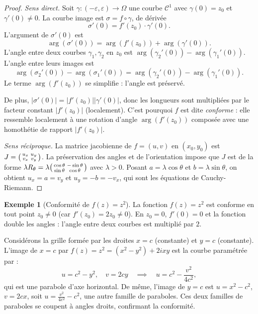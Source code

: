 \documentclass[12pt,a4paper,openany]{book}
\theoremstyle{definition}
\newtheorem{exemple}[definition]{Exemple}
\theoremstyle{plain}
\theoremstyle{remark}
\newcommand{\abs}[1]{\left|#1\right|}
\begin{document}
\begin{proof}
\emph{Sens direct.} Soit $\gamma : (-\varepsilon, \varepsilon) \to \Omega$ une courbe $\mathscr{C}^1$ avec $\gamma(0) = z_0$ et $\gamma'(0) \neq 0$. La courbe image est $\sigma = f \circ \gamma$, de dérivée
\[
  \sigma'(0) = f'(z_0) \cdot \gamma'(0).
\]
L'argument de $\sigma'(0)$ est
\[
  \arg(\sigma'(0)) = \arg(f'(z_0)) + \arg(\gamma'(0)).
\]
L'angle entre deux courbes $\gamma_1, \gamma_2$ en $z_0$ est $\arg(\gamma_2'(0)) - \arg(\gamma_1'(0))$. L'angle entre leurs images est
\[
  \arg(\sigma_2'(0)) - \arg(\sigma_1'(0)) = \arg(\gamma_2'(0)) - \arg(\gamma_1'(0)).
\]
Le terme $\arg(f'(z_0))$ se simplifie : l'angle est préservé.

De plus, $\abs{\sigma'(0)} = \abs{f'(z_0)}\abs{\gamma'(0)}$, donc les longueurs sont multipliées par le facteur constant $\abs{f'(z_0)}$ (localement). C'est pourquoi $f$ est dite \emph{conforme} : elle ressemble localement à une rotation d'angle $\arg(f'(z_0))$ composée avec une homothétie de rapport $\abs{f'(z_0)}$.

\emph{Sens réciproque.} La matrice jacobienne de $f = (u,v)$ en $(x_0, y_0)$ est $J = \begin{psmallmatrix}u_x & u_y \\ v_x & v_y\end{psmallmatrix}$. La préservation des angles et de l'orientation impose que $J$ est de la forme $\lambda R_\theta = \lambda\begin{psmallmatrix}\cos\theta & -\sin\theta \\ \sin\theta & \cos\theta\end{psmallmatrix}$ avec $\lambda > 0$. Posant $a = \lambda\cos\theta$ et $b = \lambda\sin\theta$, on obtient $u_x = a = v_y$ et $u_y = -b = -v_x$, qui sont les équations de Cauchy-Riemann.
\end{proof}

\begin{exemple}[Conformité de $f(z) = z^2$]\label{ex:conformite-z2}
La fonction $f(z) = z^2$ est conforme en tout point $z_0 \neq 0$ (car $f'(z_0) = 2z_0 \neq 0$). En $z_0 = 0$, $f'(0) = 0$ et la fonction double les angles : l'angle entre deux courbes est multiplié par $2$.

Considérons la grille formée par les droites $x = c$ (constante) et $y = c$ (constante). L'image de $x = c$ par $f(z) = z^2 = (x^2-y^2)+2ixy$ est la courbe paramétrée par :
\[
  u = c^2 - y^2, \quad v = 2cy \quad\implies\quad u = c^2 - \frac{v^2}{4c^2},
\]
qui est une parabole d'axe horizontal. De même, l'image de $y = c$ est $u = x^2 - c^2$, $v = 2cx$, soit $u = \frac{v^2}{4c^2} - c^2$, une autre famille de paraboles. Ces deux familles de paraboles se coupent à angles droits, confirmant la conformité.
\end{exemple}
\end{document}
